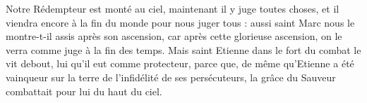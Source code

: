 Notre Rédempteur est monté au ciel, maintenant il y juge toutes choses, et il viendra encore à la fin du monde pour nous juger tous : aussi saint Marc nous le montre-t-il assis après son ascension, car après cette glorieuse ascension, on le verra comme juge à la fin des temps. Mais saint Etienne dans le fort du combat le vit debout, lui qu’il eut comme protecteur, parce que, de même qu’Etienne a été vainqueur sur la terre de l’infidélité de ses persécuteurs, la grâce du Sauveur combattait pour lui du haut du ciel.